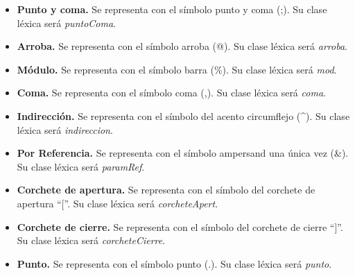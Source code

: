 \begin{itemize}
    \item \textbf{Punto y coma.} Se representa con el símbolo punto y coma (;). Su clase léxica será \textit{puntoComa}.
    \item \textbf{Arroba.} Se representa con el símbolo arroba (@). Su clase léxica será \textit{arroba}.
    \item \textbf{Módulo.} Se representa con el símbolo barra (\%). Su clase léxica será \textit{mod}.
    \item \textbf{Coma.} Se representa con el símbolo coma (,). Su clase léxica será \textit{coma}.
    \item \textbf{Indirección.} Se representa con el símbolo del acento circumflejo (\^{}). Su clase léxica será \textit{indireccion}.
    \item \textbf{Por Referencia.} Se representa con el símbolo ampersand una única vez (\&). Su clase léxica será \textit{paramRef}.
    \item \textbf{Corchete de apertura.} Se representa con el símbolo del corchete de apertura ``[''. Su clase léxica será \textit{corcheteApert}.
    \item \textbf{Corchete de cierre.} Se representa con el símbolo del corchete de cierre ``]''. Su clase léxica será \textit{corcheteCierre}.
    \item \textbf{Punto.} Se representa con el símbolo punto (.). Su clase léxica será \textit{punto}.
\end{itemize}
